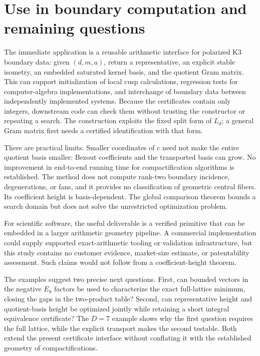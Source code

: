 \documentclass[11pt]{article}
\theoremstyle{remark}\newtheorem{remark}[theorem]{Remark}
\begin{document}
\section{Use in boundary computation and remaining questions}
The immediate application is a reusable arithmetic interface for polarized K3 boundary data: given $(d,m,a)$, return a representative, an explicit stable isometry, an embedded saturated kernel basis, and the quotient Gram matrix. This can support initialization of local cusp calculations, regression tests for computer-algebra implementations, and interchange of boundary data between independently implemented systems. Because the certificates contain only integers, downstream code can check them without trusting the constructor or repeating a search. The construction exploits the fixed split form of $L_d$; a general Gram matrix first needs a certified identification with that form.

There are practical limits. Smaller coordinates of $c$ need not make the entire quotient basis smaller: Bezout coefficients and the transported basis can grow. No improvement in end-to-end running time for compactification algorithms is established. The method does not compute rank-two boundary incidence, degenerations, or fans, and it provides no classification of geometric central fibers. Its coefficient height is basis-dependent. The global comparison theorem bounds a search domain but does not solve the unrestricted optimization problem.

For scientific software, the useful deliverable is a verified primitive that can be embedded in a larger arithmetic geometry pipeline. A commercial implementation could supply supported exact-arithmetic tooling or validation infrastructure, but this study contains no customer evidence, market-size estimate, or patentability assessment. Such claims would not follow from a coefficient-height theorem.

The examples suggest two precise next questions. First, can bounded vectors in the negative $E_8$ factors be used to characterize the exact full-lattice minimum, closing the gaps in the two-product table? Second, can representative height and quotient-basis height be optimized jointly while retaining a short integral equivalence certificate? The $D=7$ example shows why the first question requires the full lattice, while the explicit transport makes the second testable. Both extend the present certificate interface without conflating it with the established geometry of compactifications.
\end{document}
